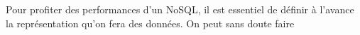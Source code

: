 Pour profiter des performances d'un NoSQL, il est essentiel de définir
à l'avance la représentation qu'on fera des données. On peut sans doute faire
